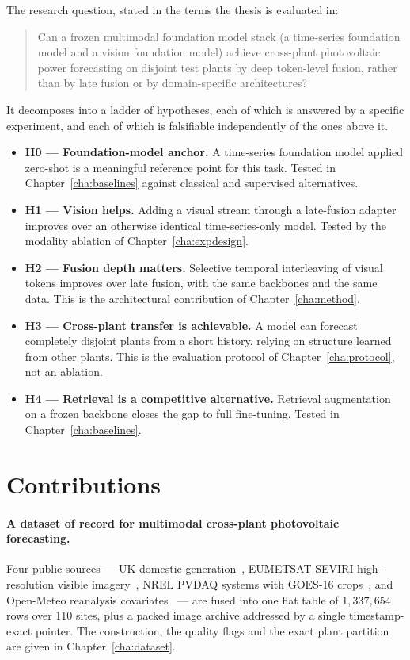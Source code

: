 The research question, stated in the terms the thesis is evaluated in:

\begin{quote}
  Can a frozen multimodal foundation model stack (a time-series foundation model and a
  vision foundation model) achieve cross-plant photovoltaic power forecasting on disjoint
  test plants by deep token-level fusion, rather than by late fusion or by domain-specific
  architectures?
\end{quote}

It decomposes into a ladder of hypotheses, each of which is answered by a specific
experiment, and each of which is falsifiable independently of the ones above it.

\begin{itemize}
  \item \textbf{H0 --- Foundation-model anchor.} A time-series foundation model applied
    zero-shot is a meaningful reference point for this task. Tested in
    Chapter~\ref{cha:baselines} against classical and supervised alternatives.
  \item \textbf{H1 --- Vision helps.} Adding a visual stream through a late-fusion adapter
    improves over an otherwise identical time-series-only model. Tested by the modality
    ablation of Chapter~\ref{cha:expdesign}.
  \item \textbf{H2 --- Fusion depth matters.} Selective temporal interleaving of visual
    tokens improves over late fusion, with the same backbones and the same data. This is
    the architectural contribution of Chapter~\ref{cha:method}.
  \item \textbf{H3 --- Cross-plant transfer is achievable.} A model can forecast completely
    disjoint plants from a short history, relying on structure learned from other plants.
    This is the evaluation protocol of Chapter~\ref{cha:protocol}, not an ablation.
  \item \textbf{H4 --- Retrieval is a competitive alternative.} Retrieval augmentation on a
    frozen backbone closes the gap to full fine-tuning. Tested in
    Chapter~\ref{cha:baselines}.
\end{itemize}

\section{Contributions}
\label{sec:contributions}

\paragraph{A dataset of record for multimodal cross-plant photovoltaic forecasting.}
Four public sources --- UK domestic generation~\cite{ukpv}, EUMETSAT SEVIRI high-resolution
visible imagery~\cite{eumetsat}, NREL PVDAQ systems with GOES-16 crops~\cite{pvdaq}, and
Open-Meteo reanalysis covariates~\cite{openmeteo} --- are fused into one flat table of
$1{,}337{,}654$ rows over 110 sites, plus a packed image archive addressed by a single
timestamp-exact pointer. The construction, the quality flags and the exact plant partition
are given in Chapter~\ref{cha:dataset}.

